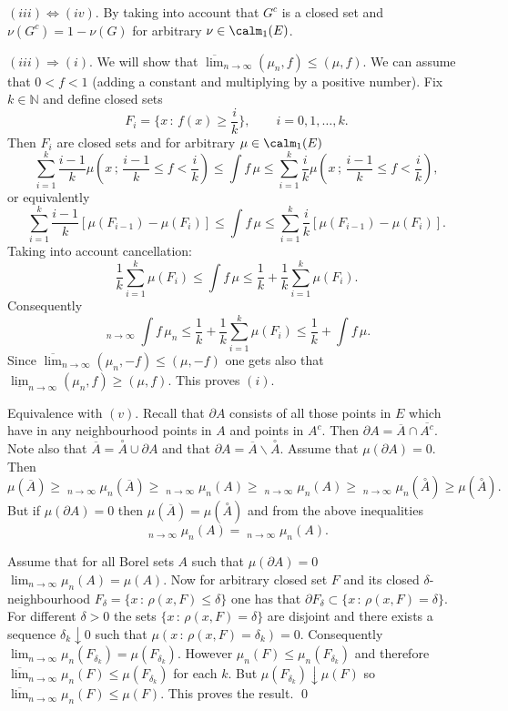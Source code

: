 \documentclass[preprint]{imsart}
\def\N{\mathbb N}
\begin{document}
{$(iii)\Leftrightarrow (iv)$. By taking into account
that $G^c$ is a closed set and $\nu(G^c)=1-\nu(G)$ for
arbitrary $\nu\in\calm_1(E)$.



$(iii)\Rightarrow (i)$. We will show that
$\overline{\lim}_{n\to\infty}
  (\mu_n,f)\leq (\mu, f)$. We can assume
that $0<f<1$ (adding a constant and multiplying by a
positive number). Fix $k\in\N$ and define closed sets
$$
F_i=\{ x\, :\, f(x)\geq \frac{i}{k}\},\qquad
i=0,1,\ldots,k.
$$
Then $F_i$ are closed sets and for arbitrary
$\mu\in\calm_1(E)$
$$
\sum_{i=1}^k\frac{i-1}{k}
\mu\left(x\, ;\, \frac{i-1}{k}\leq f<\frac{i}{k}\right)
\leq \int f\, \mu\leq
\sum_{i=1}^k\frac{i}{k}
\mu\left(x\, ;\, \frac{i-1}{k}\leq f<\frac{i}{k}\right),
$$
or equivalently
$$
\sum_{i=1}^k\frac{i-1}{k}
 \left[ \mu(F_{i-1})-\mu(F_i)\right]
\leq \int f\, \mu\leq
\sum_{i=1}^k\frac{i}{k}
 \left[ \mu(F_{i-1})-\mu(F_i)\right].
$$
Taking into account cancellation:
$$
\frac{1}{k}\sum_{i=1}^k \mu(F_i) \leq \int f\, \mu\leq
\frac{1}{k}+\frac{1}{k}\sum_{i=1}^k\mu(F_i).
$$
Consequently
$$
\mathop{\overline{\lim}}_{n\to\infty}\int f\, \mu_n\leq
\frac{1}{k}+\frac{1}{k}\sum_{i=1}^k\mu(F_i)
\leq \frac{1}{k}+\int f\, \mu.
$$
Since $\overline{\lim}_{n\to\infty}(\mu_n,-f)
\leq (\mu,-f)$ one gets also that
$\underline{\lim}_{n\to\infty}(\mu_n,f)
\geq (\mu,f)$. This proves $(i)$.

Equivalence with $(v)$. Recall that $\partial A$
consists of all those points in $E$ which have in any
neighbourhood points in $A$ and points in $A^c$. Then
$\partial A=\overline{A}\cap \overline{A^c}$. Note also
that $\overline{A} = \stackrel{\circ}{A}\cup \partial
A$ and that $\partial A = \overline{A}\backslash
\stackrel{\circ}{A}$. Assume that $\mu(\partial A)=0$.
Then
$$
\mu(\overline{A})
\geq\mathop{\overline{\lim}}_{n\to\infty} \mu_n(\overline{A})
\geq\mathop{\overline{\lim}}_{n\to\infty}\mu_n( {A})
\geq\mathop{\underline{\lim}}_{n\to\infty}\mu_n( {A})
\geq\mathop{\underline{\lim}}_{n\to\infty} \mu_n(\stackrel{\circ}{A})
\geq \mu( \stackrel{\circ}{A}).
$$
But if $\mu(\partial A)=0$ then $
\mu(\overline{A})=\mu(
\stackrel{\circ}{A})$ and from the above inequalities
$$
\mathop{\overline{\lim}}_{n\to\infty} \mu_n( {A})=
\mathop{\underline{\lim}}_{n\to\infty} \mu_n( {A}).
$$


Assume that for all Borel sets $A$ such that
$\mu(\partial A)=0$ $ {\lim}_{n\to\infty}
\mu_n( {A})=\mu(A)$. Now for arbitrary closed
set $F$ and its closed $\delta$-neighbourhood
$F_\delta=\{ x\, :\, \rho(x,F)\leq \delta \}$ one has
that $\partial F_\delta \subset \{x\, :\, \rho(x,F)=
\delta\}$. For different $\delta >0$ the sets
$\{x\, :\, \rho(x,F)=
\delta\}$ are disjoint and there exists a
sequence $\delta_k\downarrow 0$ such that $\mu(x\, :\,
\rho(x,F)=\delta_k)=0$. Consequently
$\lim_{n\to\infty}\mu_n(F_{\delta_k})=\mu(F_{\delta_k})$.
However $\mu_n(F)\leq \mu_n(F_{\delta_k})$ and
therefore $\overline{\lim}_{n\to\infty} \mu_n(F)\leq
\mu(F_{\delta_k})$ for each $k$. But
$\mu(F_{\delta_k})\downarrow \mu(F)$ so
 $\overline{\lim}_{n\to\infty} \mu_n(F)\leq\mu(F)$.
  This proves the result. \qed

}
\end{document}
